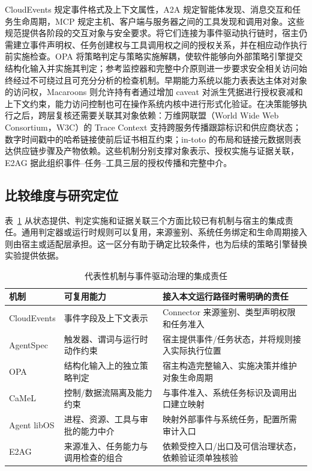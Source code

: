 CloudEvents 规定事件格式及上下文属性，A2A 规定智能体发现、消息交互和任务生命周期，MCP 规定主机、客户端与服务器之间的工具发现和调用对象\cite{cloudevents,a2a,mcp}。这些规范提供各阶段的交互对象与安全要求。将它们连接为事件驱动执行链时，宿主仍需建立事件声明权、任务创建权与工具调用权之间的授权关系，并在相应动作执行前实施检查。OPA 将策略判定与策略实施解耦，使软件能够向外部策略引擎提交结构化输入并实施其判定\cite{opa}；参考监控器和完整中介原则进一步要求安全相关访问始终经过不可绕过且可充分分析的检查机制\cite{reference-monitor,saltzer-schroeder}。早期能力系统以能力表表达主体对对象的访问权，Macaroons 则允许持有者通过增加 caveat 对派生凭据进行授权衰减和上下文约束，能力访问控制也可在操作系统内核中进行形式化验证\cite{dennis-capability,macaroons,cap-os}。在决策能够执行之后，跨层复核还需要关联其对象依赖：万维网联盟（World Wide Web Consortium，W3C）的 Trace Context 支持跨服务传播跟踪标识和供应商状态；数字时间戳中的哈希链接使前后证书相互约束；in-toto 的布局和链接元数据则表达供应链步骤及产物依赖\cite{trace-context,haber-stornetta,in-toto}。这些机制分别支撑对象表示、授权实施与证据关联，E2AG 据此组织事件--任务--工具三层的授权传播和完整中介。

\subsection{比较维度与研究定位}

表~\ref{tab:related-scope-v11} 从状态提供、判定实施和证据关联三个方面比较已有机制与宿主的集成责任。通用判定器或运行时规则可以复用，来源鉴别、系统任务绑定和生命周期接入则由宿主或适配层承担。这一区分有助于确定比较条件，也为后续的策略引擎替换实验提供依据。

\begin{table}[htbp]
\centering
\caption{代表性机制与事件驱动治理的集成责任}
\label{tab:related-scope-v11}
\small
\begin{tabular}{p{23mm}p{49mm}p{65mm}}
\toprule
机制 & 可复用能力 & 接入本文运行路径时需明确的责任 \\
\midrule
CloudEvents & 事件字段及上下文表示 & Connector 来源鉴别、类型声明权限和任务准入 \\
AgentSpec & 触发器、谓词与运行时动作约束 & 宿主提供事件/任务状态，并将规则接入实际执行位置 \\
OPA & 结构化输入上的独立策略判定 & 宿主构造完整输入、实施决策并维护对象生命周期 \\
CaMeL & 控制/数据流隔离及能力约束 & 与事件准入、系统任务标识及调用出口建立映射 \\
Agent libOS & 进程、资源、工具与审批的能力中介 & 映射外部事件与系统任务，配置所需审计入口 \\
E2AG & 来源准入、任务能力与调用检查的组合 & 依赖受控入口/出口及可信治理状态，依赖验证须单独核验 \\
\bottomrule
\end{tabular}
\end{table}


